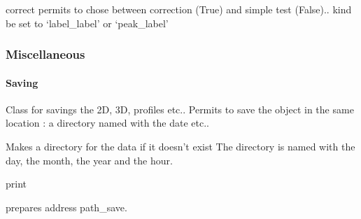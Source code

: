 \documentclass[letterpaper,10pt,openany,oneside]{sphinxmanual}
\begin{document}
\begin{fulllineitems}
\begin{fulllineitems}
\end{fulllineitems}


\begin{fulllineitems}
\label{rst/visu2d:Visu.label_2D.PEAKPICK.test_correct}
correct permits to chose between correction (True) and simple test (False).. 
kind be set to `label\_label' or `peak\_label'

\end{fulllineitems}


\end{fulllineitems}



\subsubsection{Miscellaneous}
\label{rst/visu2d:miscellaneous}

\paragraph{Saving}
\label{rst/visu2d:module-Visu.Saving}\label{rst/visu2d:saving}

\begin{fulllineitems}
\label{rst/visu2d:Visu.Saving.SAVE}
Class for savings the 2D, 3D, profiles etc.. 
Permits to save the object in the same location : a directory named with the date etc..

\begin{fulllineitems}
\label{rst/visu2d:Visu.Saving.SAVE.dir_save}
Makes a directory for the data if it doesn't exist
The directory is named with the day, the month, the year and the hour.

\end{fulllineitems}


\begin{fulllineitems}
\label{rst/visu2d:Visu.Saving.SAVE.pr}
print

\end{fulllineitems}


\begin{fulllineitems}
\label{rst/visu2d:Visu.Saving.SAVE.prep_path_save}
prepares address path\_save.

\end{fulllineitems}


\end{fulllineitems}
\end{document}
